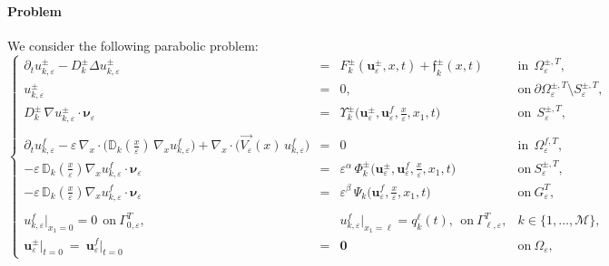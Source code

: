 \documentclass[reqno]{amsart}            %
\numberwithin{equation}{section}
\begin{document}
	\paragraph*{{\bf Problem}} We consider the following parabolic  problem:
	\begin{equation}\label{probl}
		\left\{\begin{array}{rcll}
			\partial_t u^\pm_{k,\varepsilon} -  D^\pm_k  \Delta u^\pm_{k,\varepsilon}
			& = & F^\pm_k(\mathbf{u}^\pm_\varepsilon, x, t) + \mathfrak{f}_k^\pm(x,t) &
			\text{in} \ \ \Omega^{\pm, T}_\varepsilon,
			\\[2mm]
			u^\pm_{k,\varepsilon}
			& = & 0, & \text{on} \ \partial\Omega^{\pm, T}_\varepsilon \setminus S^{\pm, T}_\varepsilon,
			\\[2mm]
			D^\pm_k \, \nabla u^\pm_{k,\varepsilon} \cdot \boldsymbol{\nu}_\varepsilon &=&  \Upsilon^\pm_k\big( \mathbf{u}^\pm_\varepsilon, \mathbf{u}^f_\varepsilon, \tfrac{x}{\varepsilon}, x_1, t \big) &  \text{on} \ \   S^{\pm, T}_\varepsilon,
			\\
			
			\\
			\partial_t u^f_{k,\varepsilon} -  \varepsilon\, \nabla_x \cdot\big( \mathbb{D}_k(\tfrac{x}{\varepsilon}) \, \nabla_x u^f_{k,\varepsilon}\big) +
			\nabla_x \cdot \big( \overrightarrow{V_\varepsilon}(x) \, u^f_{k,\varepsilon}\big) &=& 0  & \text{in} \ \ \Omega^{f, T}_\varepsilon,
			\\[2mm]
			-  \varepsilon \,  \mathbb{D}_k(\tfrac{x}{\varepsilon})\nabla_x u^f_{k,\varepsilon}  \cdot \boldsymbol{\nu}_\varepsilon &  = & \varepsilon^\alpha \, \Phi^\pm_k\big(\mathbf{u}^\pm_\varepsilon, \mathbf{u}^f_\varepsilon, \tfrac{x}{\varepsilon}, x_1, t\big) &
			\text{on} \ S^{\pm, T}_\varepsilon,
			\\[2mm]
			-  \varepsilon \,  \mathbb{D}_k(\tfrac{x}{\varepsilon})\nabla_x u^f_{k,\varepsilon} \cdot \boldsymbol{\nu}_\varepsilon &  = & \varepsilon^\beta \, \Psi_k\big(\mathbf{u}^f_\varepsilon, \tfrac{x}{\varepsilon}, x_1, t\big) &
			\text{on} \ G^T_\varepsilon,
			\\
			
			\\
			u^f_{k,\varepsilon}\big|_{x_1= 0} = 0 \ \ \text{on} \ \Gamma^T_{0,\varepsilon},
			& & 
			u^f_{k,\varepsilon}\big|_{x_1=\ell}
			=  q^\ell_k(t), \ \  \text{on} \ \Gamma^T_{\ell,\varepsilon}, &k\in \{1,\ldots, \mathcal{M}\},
			\\[4mm]
			\mathbf{u}^\pm_\varepsilon\big|_{t=0} \ = \ \mathbf{u}^f_\varepsilon\big|_{t=0}&=& \mathbf{0} & \text{on} \ \Omega_{\varepsilon},
		\end{array}\right.
	\end{equation}
\end{document}
